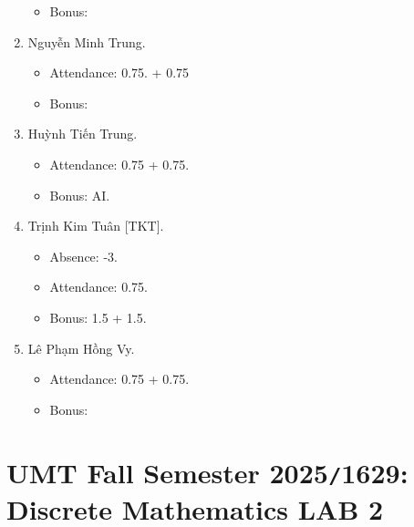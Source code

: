 \documentclass{article}
\begin{document}
\begin{enumerate}
\begin{itemize}
        \item Bonus:
    \end{itemize}
    \item {\sc Nguyễn Minh Trung.}
    \begin{itemize}
        \item Attendance: 0.75. + 0.75
        \item Bonus:
    \end{itemize}
    \item {\sc Huỳnh Tiến Trung.}
    \begin{itemize}
        \item Attendance: 0.75 + 0.75.
        \item Bonus: AI.
    \end{itemize}
    \item {\sc Trịnh Kim Tuân [TKT].}
    \begin{itemize}
        \item Absence: -3.
        \item Attendance: 0.75.
        \item Bonus: 1.5 + 1.5.
    \end{itemize}
    \item {\sc Lê Phạm Hồng Vy.}
    \begin{itemize}
        \item Attendance: 0.75 + 0.75.
        \item Bonus:
    \end{itemize}
\end{enumerate}


\section{UMT Fall Semester 2025{\tt/}1629: Discrete Mathematics LAB 2}
\end{document}
